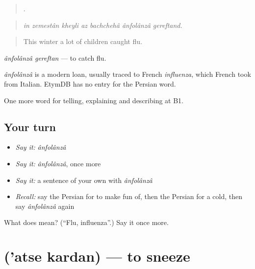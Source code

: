 \begin{quote}
       .
\end{quote}

\begin{quote}
\emph{in zemestân kheyli az bachchehâ ânfolânzâ gereftand.}
\end{quote}

\begin{quote}
This winter a lot of children caught flu.
\end{quote}

\emph{ânfolânzâ gereftan} — to catch flu.

\begin{cousinweb}
\emph{ânfolânzâ} is a modern loan, usually traced to French \emph{influenza}, which French took from Italian. EtymDB has no entry for the Persian word.
\end{cousinweb}

\begin{grammarlens}[title={What you've built}]
One more word for telling, explaining and describing at B1.
\end{grammarlens}

\subsection*{Your turn}
\begin{itemize}
\raggedright
  \item \emph{Say it:} \emph{ânfolânzâ}
  \item \emph{Say it:} \emph{ânfolânzâ}, once more
  \item \emph{Say it:} a sentence of your own with \emph{ânfolânzâ}
  \item \emph{Recall:} say the Persian for to make fun of, then the Persian for a cold, then say \emph{ânfolânzâ} again
\end{itemize}

\begin{tcolorbox}[breakable,colback=teal!4,colframe=teal!35!black,title={Before you move on}]
What does  mean? (\textquotedblleft{}Flu, influenza\textquotedblright{}.) Say it once more.
\end{tcolorbox}
\section[\texorpdfstring{\fa{عطسه} \fa{کردن} ('atse kardan)}{عطسه کردن ('atse kardan)}]{  ('atse kardan) — to sneeze}

